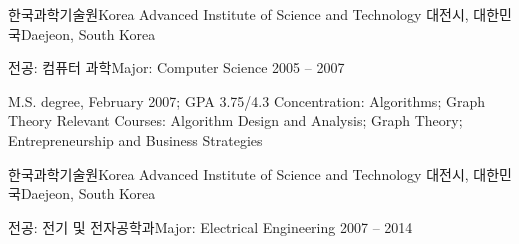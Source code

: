 \documentclass[english,full]{resume_structure}
\begin{document}
\begin{Education}
\ResumeSectionWithSubSection %
{한국과학기술원}{Korea Advanced Institute of Science and Technology}
{대전시, 대한민국}{Daejeon, South Korea} 
{
  \ResumeSubSection %
  {전공: 컴퓨터 과학}{Major: Computer Science}
  {2005 -- 2007}
  {
  \begin{itemize}
  \end{itemize}
  }{
  \begin{itemize}
     {M.S. degree, February 2007; GPA 3.75/4.3}
     {Concentration: Algorithms; Graph Theory}
     {Relevant Courses: Algorithm Design and Analysis; Graph Theory; Entrepreneurship and Business Strategies}
  \end{itemize}
  }
}
\ResumeSectionWithSubSection %
{한국과학기술원}{Korea Advanced Institute of Science and Technology}
{대전시, 대한민국}{Daejeon, South Korea} 
{
  \ResumeSubSection %
  {전공: 전기 및 전자공학과}{Major: Electrical Engineering}
  {2007 -- 2014}
  {
  \begin{itemize}
  \end{itemize}
  }{
  \begin{itemize}
  \end{itemize}
  }
}
\end{Education}
\end{document}
